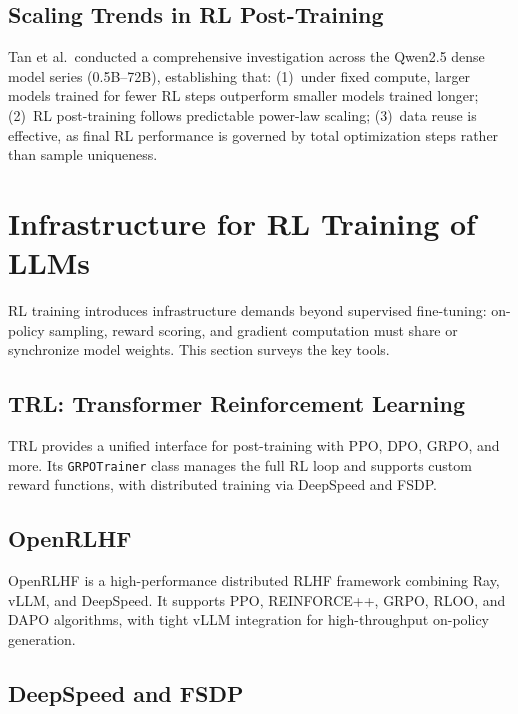 \documentclass[12pt,a4paper]{report}
\begin{document}
\subsection{Scaling Trends in RL Post-Training}

Tan et al.\ conducted a comprehensive investigation across the Qwen2.5 dense model series (0.5B--72B), establishing that: (1)~under fixed compute, larger models trained for fewer RL steps outperform smaller models trained longer; (2)~RL post-training follows predictable power-law scaling; (3)~data reuse is effective, as final RL performance is governed by total optimization steps rather than sample uniqueness.


\section{Infrastructure for RL Training of LLMs}
\label{sec:infrastructure-rl-training}

RL training introduces infrastructure demands beyond supervised fine-tuning: on-policy sampling, reward scoring, and gradient computation must share or synchronize model weights. This section surveys the key tools.

\subsection{TRL: Transformer Reinforcement Learning}

TRL \cite{vonwerra2022trl} provides a unified interface for post-training with PPO, DPO, GRPO, and more. Its \texttt{GRPOTrainer} class manages the full RL loop and supports custom reward functions, with distributed training via DeepSpeed and FSDP.

\subsection{OpenRLHF}

OpenRLHF is a high-performance distributed RLHF framework combining Ray, vLLM, and DeepSpeed. It supports PPO, REINFORCE++, GRPO, RLOO, and DAPO algorithms, with tight vLLM integration for high-throughput on-policy generation.

\subsection{DeepSpeed and FSDP}
\end{document}
